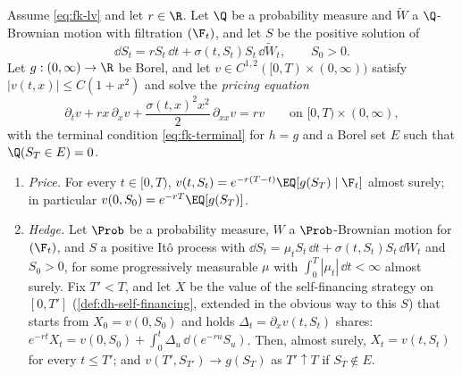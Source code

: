 \begin{corollary}\label{cor:fk-pricing-pde}
Assume \eqref{eq:fk-lv} and let $r\in\R$. Let $\Q$ be a probability measure and $\widetilde W$ a
$\Q$-Brownian motion with filtration $(\F_t)$, and let $S$ be the positive solution of
\[
  \dd S_t=rS_t\,\dd t+\sigma(t,S_t)S_t\,\dd\widetilde W_t,\qquad S_0>0 .
\]
Let $g:(0,\infty)\to\R$ be Borel, and let $v\in C^{1,2}([0,T)\times(0,\infty))$ satisfy
$|v(t,x)|\le C(1+x^2)$ and solve the \emph{pricing equation}
\begin{equation}\label{eq:fk-pricing-pde}
  \partial_tv+rx\,\partial_xv+\frac{\sigma(t,x)^2x^2}{2}\,\partial_{xx}v=rv\qquad\text{on }[0,T)\times(0,\infty),
\end{equation}
with the terminal condition \eqref{eq:fk-terminal} for $h=g$ and a Borel set $E$ such that
$\Q(S_T\in E)=0$.
\begin{enumerate}[label=(\alph*)]
  \item \emph{Price.} For every $t\in[0,T)$, $v(t,S_t)=e^{-r(T-t)}\EQ[g(S_T)\mid\F_t]$ almost
    surely; in particular $v(0,S_0)=e^{-rT}\EQ[g(S_T)]$.
    \item \emph{Hedge.} Let $\Prob$ be a probability measure, $W$ a $\Prob$-Brownian motion for
    $(\F_t)$, and $S$ a positive It\^o process with $\dd S_t=\mu_tS_t\,\dd t+\sigma(t,S_t)S_t\,\dd W_t$
    and $S_0>0$, for some progressively measurable $\mu$ with $\int_0^T|\mu_t|\,\dd t<\infty$
    almost surely. Fix $T'<T$, and let $X$ be the value of the self-financing strategy on $[0,T']$
    (\cref{def:dh-self-financing}, extended in the obvious way to this $S$) that starts from
    $X_0=v(0,S_0)$ and holds $\Delta_t=\partial_xv(t,S_t)$ shares:
    $e^{-rt}X_t=v(0,S_0)+\int_0^t\Delta_u\,\dd(e^{-ru}S_u)$. Then, almost surely, $X_t=v(t,S_t)$
    for every $t\le T'$; and $v(T',S_{T'})\to g(S_T)$ as $T'\uparrow T$ if $S_T\notin E$.
\end{enumerate}
\end{corollary}

